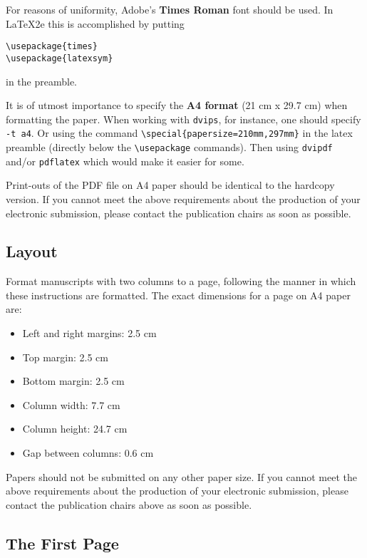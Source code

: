 \documentclass[11pt,letterpaper]{article}
\begin{document}
For reasons of uniformity, Adobe's {\bf Times Roman} font should be
used. In \LaTeX2e{} this is accomplished by putting

\small
\begin{verbatim}
\usepackage{times}
\usepackage{latexsym}
\end{verbatim}
\normalsize
in the preamble.

It is of utmost importance to specify the \textbf{A4 format} (21 cm
x 29.7 cm) when formatting the paper. When working with
{\tt dvips}, for instance, one should specify {\tt -t a4}.
Or using the command \verb|\special{papersize=210mm,297mm}| in the latex
preamble (directly below the \verb|\usepackage| commands). Then using 
{\tt dvipdf} and/or {\tt pdflatex} which would make it easier for some.

Print-outs of the PDF file on A4 paper should be identical to the
hardcopy version. If you cannot meet the above requirements about the
production of your electronic submission, please contact the
publication chairs as soon as possible.

\subsection{Layout}
\label{ssec:layout}

Format manuscripts with two columns to a page, following the manner in
which these instructions are formatted. The exact dimensions for a page
on A4 paper are:

\begin{itemize}
\item Left and right margins: 2.5 cm
\item Top margin: 2.5 cm
\item Bottom margin: 2.5 cm
\item Column width: 7.7 cm
\item Column height: 24.7 cm
\item Gap between columns: 0.6 cm
\end{itemize}

\noindent Papers should not be submitted on any other paper size.
 If you cannot meet the above requirements about the production of 
 your electronic submission, please contact the publication chairs 
 above as soon as possible.

\subsection{The First Page}
\label{ssec:first}
\end{document}
